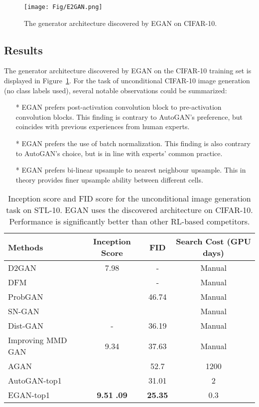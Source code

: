 \documentclass[runningheads]{llncs}
\begin{document}
\begin{figure}[ht!bp]
    \centering
\texttt{[image: Fig/E2GAN.png]}
    \caption{The generator architecture discovered by EGAN on CIFAR-10.}
    \label{fig:EGAN}
\end{figure}
\subsection{Results}
The generator architecture discovered by EGAN on the CIFAR-10 training set is displayed in Figure~\ref{fig:EGAN}. For the task of unconditional CIFAR-10 image generation (no class labels used), several notable observations could be summarized:

\begin{itemize}
\item[*] EGAN prefers post-activation convolution block to pre-activation convolution blocks. This finding is contrary to AutoGAN's preference, but coincides with previous experiences from human experts.
\item[*] EGAN prefers the use of batch normalization. This finding is also contrary to AutoGAN's choice, but is in line with experts' common practice. 
\item[*] EGAN prefers bi-linear upsample to nearest neighbour upsample. This in theory provides finer upsample ability between different cells. 
\end{itemize}




\begin{table}[b!]
\begin{center}
\begin{tabular}{l|c|c|c}
Methods&Inception Score&FID&Search Cost (GPU days)\\
\hline
D2GAN~\cite{nguyen2017dual}& 7.98&-& Manual\\
DFM~\cite{warde2016improving}&&-&Manual\\
ProbGAN~\cite{he2019probgan}& &46.74 &Manual \\
SN-GAN~\cite{miyato2018spectral}&  &&Manual\\
Dist-GAN~\cite{tran2018dist}&- &36.19&Manual\\
Improving MMD GAN~\cite{wang2018improving}  & 9.34&37.63&Manual\\\hline
AGAN~\cite{wang2019agan}&&52.7&1200\\
AutoGAN-top1~\cite{gong2019autogan}&   &31.01&2\\
\hline
EGAN-top1 & \textbf{9.51}  \textbf{.09} &\textbf{25.35} &0.3\\

\end{tabular}
\end{center}
\caption{Inception score and FID score for the unconditional image generation task on STL-10. EGAN  uses the discovered architecture on CIFAR-10. Performance is significantly better than other RL-based competitors.}
\label{rstl}
\end{table}
\end{document}

